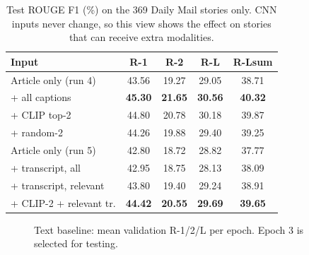 \documentclass[conference]{IEEEtran}
\begin{document}
\begin{table}[t]
\caption{Test ROUGE F1 (\%) on the 369 Daily Mail stories only. CNN inputs never change, so this view shows the effect on stories that can receive extra modalities.}
\label{tab:dm}
\centering
\begin{tabular}{lcccc}
\toprule
Input & R-1 & R-2 & R-L & R-Lsum \\
\midrule
Article only (run 4) & 43.56 & 19.27 & 29.05 & 38.71 \\
+ all captions       & \textbf{45.30} & \textbf{21.65} & \textbf{30.56} & \textbf{40.32} \\
+ CLIP top-2         & 44.80 & 20.78 & 30.18 & 39.87 \\
+ random-2           & 44.26 & 19.88 & 29.40 & 39.25 \\
\midrule
Article only (run 5)   & 42.80 & 18.72 & 28.82 & 37.77 \\
+ transcript, all      & 42.95 & 18.75 & 28.13 & 38.09 \\
+ transcript, relevant & 43.80 & 19.40 & 29.24 & 38.91 \\
+ CLIP-2 + relevant tr.& \textbf{44.42} & \textbf{20.55} & \textbf{29.69} & \textbf{39.65} \\
\bottomrule
\end{tabular}
\end{table}

\begin{figure}[t]
\centering
{}
\caption{Text baseline: mean validation R-1/2/L per epoch. Epoch 3 is selected for testing.}
\label{fig:epochs}
\end{figure}
\end{document}
